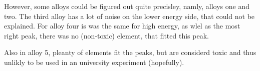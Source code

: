 However, some alloys could be figured out quite precisley, namly, alloys one and two.
The third alloy has a lot of noise on the lower energy side, that could not be explained. For alloy four is was the same for high energy, as wlel as the most right peak, there was no (non-toxic) element, that fitted this peak.

Also in alloy 5, pleanty of elements fit the peaks, but are considerd toxic and thus unlikly to be used in an university experiment (hopefully).


